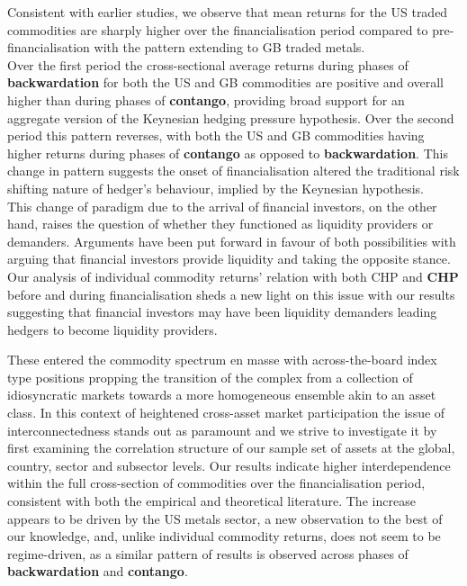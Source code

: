\documentclass[
  authoryear,
  preprint,
  3p]{elsarticle}
\begin{document}
\bigskip
\bigskip

Consistent with earlier studies, we observe that mean returns for the US
traded commodities are sharply higher over the financialisation period
compared to pre-financialisation with the pattern extending to GB traded
metals.\\
Over the first period the cross-sectional average returns during phases
of \textbf{backwardation} for both the US and GB commodities are
positive and overall higher than during phases of \textbf{contango},
providing broad support for an aggregate version of the Keynesian
hedging pressure hypothesis. Over the second period this pattern
reverses, with both the US and GB commodities having higher returns
during phases of \textbf{contango} as opposed to \textbf{backwardation}.
This change in pattern suggests the onset of financialisation altered
the traditional risk shifting nature of hedger's behaviour, implied by
the Keynesian hypothesis.\\
This change of paradigm due to the arrival of financial investors, on
the other hand, raises the question of whether they functioned as
liquidity providers or demanders. Arguments have been put forward in
favour of both possibilities with \citet{moskowitz_time_2012} arguing
that financial investors provide liquidity and \citet{kang_tale_2020}
taking the opposite stance. Our analysis of individual commodity
returns' relation with both CHP and \textbf{CHP} before and during
financialisation sheds a new light on this issue with our results
suggesting that financial investors may have been liquidity demanders
leading hedgers to become liquidity providers.

\medskip

These entered the commodity spectrum en masse with across-the-board
index type positions propping the transition of the complex from a
collection of idiosyncratic markets towards a more homogeneous ensemble
akin to an asset class. In this context of heightened cross-asset market
participation the issue of interconnectedness stands out as paramount
and we strive to investigate it by first examining the correlation
structure of our sample set of assets at the global, country, sector and
subsector levels. Our results indicate higher interdependence within the
full cross-section of commodities over the financialisation period,
consistent with both the empirical and theoretical literature. The
increase appears to be driven by the US metals sector, a new observation
to the best of our knowledge, and, unlike individual commodity returns,
does not seem to be regime-driven, as a similar pattern of results is
observed across phases of \textbf{backwardation} and \textbf{contango}.
\end{document}
